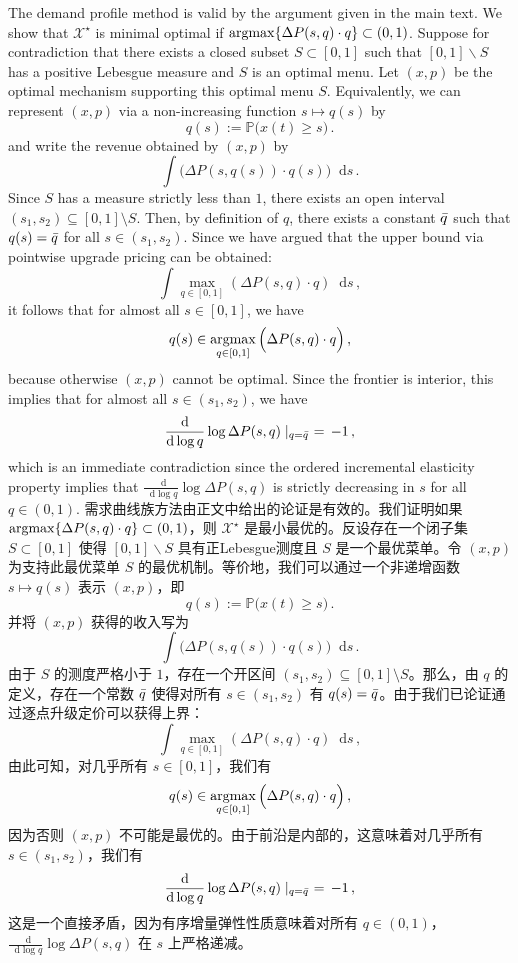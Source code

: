 \documentclass[12pt,letterpaper]{article}
\newenvironment{original}{\color{black}\noindent}{}
\newenvironment{translation}{\color{blue}\noindent}{}
\theoremstyle{plain}
\theoremstyle{definition}
\theoremstyle{remark}
\renewcommand{\P}{\mathds{P}}
\renewcommand{\1}{\mathds{1}}
\renewcommand*\d{\mathop{}\!\mathrm{d}}
\newcommand{\argmax}{\operatornamewithlimits{argmax}}
\newcommand{\X}{\mathcal{X}}
\theoremstyle{definition}
\begin{document}
\begin{original}
The demand profile method is valid by the argument given in the main text. We show that $\X^\star$ is minimal optimal if $\argmax \{\Delta P(s, q) \cdot q\} \subset (0, 1)$. Suppose for contradiction that there exists a closed subset $S \subset [0, 1]$ such that $[0, 1]\backslash S$ has a positive Lebesgue measure and $S$ is an optimal menu. Let $(x, p)$ be the optimal mechanism supporting this optimal menu $S$. Equivalently, we can represent $(x, p)$ via a non-increasing function $s \mapsto q(s)$ by
\[q(s) := \P\big(x(t) \geq s\big)\,.\]
and write the revenue obtained by $(x, p)$ by
\[\int \big(\Delta P(s, q(s)) \cdot q(s)\big) \d s\,.\]
Since $S$ has a measure strictly less than $1$, there exists an open interval $(s_1, s_2) \subseteq [0,1]\setminus S$. Then, by definition of $q$, there exists a constant $\Bar{q}$ such that $q(s) = \Bar{q}$ for all $s \in (s_1, s_2)$. Since we have argued that the upper bound via pointwise upgrade pricing can be obtained:
\[\int \max_{q \in [0, 1]}(\Delta P(s, q) \cdot q) \d s\,,\]
it follows that for almost all $s \in [0, 1]$, we have
\[q(s) \in \argmax_{q \in [0, 1]}\Big(\Delta P(s, q) \cdot q\Big)\,,\]
because otherwise $(x, p)$ cannot be optimal. Since the frontier is interior, this implies that for almost all $s \in (s_1, s_2)$, we have
\[\frac{\d}{\d \log q} \log \Delta P(s, q) \mid_{q = \Bar{q}} \,\,=\, -1\,, \]
which is an immediate contradiction since the ordered incremental elasticity property implies that $\frac{\d}{\d \log q} \log \Delta P(s, q)$ is strictly decreasing in $s$ for all $q \in (0, 1)$.
\end{original}
\begin{translation}
需求曲线族方法由正文中给出的论证是有效的。我们证明如果 $\argmax \{\Delta P(s, q) \cdot q\} \subset (0, 1)$，则 $\X^\star$ 是最小最优的。反设存在一个闭子集 $S \subset [0, 1]$ 使得 $[0, 1]\backslash S$ 具有正Lebesgue测度且 $S$ 是一个最优菜单。令 $(x, p)$ 为支持此最优菜单 $S$ 的最优机制。等价地，我们可以通过一个非递增函数 $s \mapsto q(s)$ 表示 $(x, p)$，即
\[q(s) := \P\big(x(t) \geq s\big)\,.\]
并将 $(x, p)$ 获得的收入写为
\[\int \big(\Delta P(s, q(s)) \cdot q(s)\big) \d s\,.\]
由于 $S$ 的测度严格小于 $1$，存在一个开区间 $(s_1, s_2) \subseteq [0,1]\setminus S$。那么，由 $q$ 的定义，存在一个常数 $\Bar{q}$ 使得对所有 $s \in (s_1, s_2)$ 有 $q(s) = \Bar{q}$。由于我们已论证通过逐点升级定价可以获得上界：
\[\int \max_{q \in [0, 1]}(\Delta P(s, q) \cdot q) \d s\,,\]
由此可知，对几乎所有 $s \in [0, 1]$，我们有
\[q(s) \in \argmax_{q \in [0, 1]}\Big(\Delta P(s, q) \cdot q\Big)\,,\]
因为否则 $(x, p)$ 不可能是最优的。由于前沿是内部的，这意味着对几乎所有 $s \in (s_1, s_2)$，我们有
\[\frac{\d}{\d \log q} \log \Delta P(s, q) \mid_{q = \Bar{q}} \,\,=\, -1\,, \]
这是一个直接矛盾，因为有序增量弹性性质意味着对所有 $q \in (0, 1)$，$\frac{\d}{\d \log q} \log \Delta P(s, q)$ 在 $s$ 上严格递减。
\end{translation}
\end{document}
